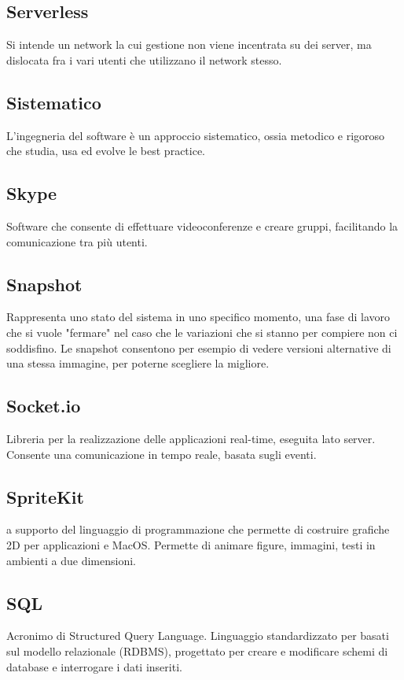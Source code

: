 \subsection*{Serverless}
Si intende un network la cui gestione non viene incentrata su dei server, ma dislocata fra i vari utenti che utilizzano il network stesso.

\subsection*{Sistematico}
L'ingegneria del software è un approccio sistematico, ossia metodico e rigoroso che studia, usa ed evolve le best practice.

\subsection*{Skype}
Software che consente di effettuare videoconferenze e creare gruppi, facilitando la comunicazione tra più utenti. 

\subsection*{Snapshot}
Rappresenta uno stato del sistema in uno specifico momento, una fase di lavoro che si vuole "fermare" nel caso che le variazioni che si stanno per compiere non ci soddisfino. Le snapshot consentono per esempio di vedere versioni alternative di una stessa immagine, per poterne scegliere la migliore.

\subsection*{Socket.io}
Libreria  per la realizzazione delle applicazioni real-time, eseguita lato server. Consente una comunicazione in tempo reale, basata sugli eventi.

\subsection*{SpriteKit}
 a supporto del linguaggio di programmazione  che permette di costruire grafiche 2D per applicazioni  e MacOS. Permette di animare figure, immagini, testi in ambienti a due dimensioni.

\subsection*{SQL}
Acronimo di Structured Query Language. Linguaggio standardizzato per  basati sul modello relazionale (RDBMS), progettato per creare e modificare schemi di database e interrogare i dati inseriti.


